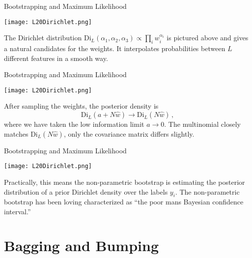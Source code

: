 \documentclass[10pt, table, dvipsnames,xcdraw, handout]{beamer}
\begin{document}
\begin{frame}[fragile]{Bootstrapping and Maximum Likelihood}
  \begin{minipage}[t][0.5\textheight][t]{\textwidth}
	\centering \texttt{[image: L20Dirichlet.png]} 
  \end{minipage}
  \vfill
\begin{minipage}[t][0.5\textheight][t]{\textwidth}
The Dirichlet distribution $\text{Di}_L(\alpha_1,\alpha_2, \alpha_3)\propto \prod_i w_i^{\alpha_i}$ is pictured above and gives a natural candidates for the weights. It interpolates probabilities between $L$ different features in a smooth way.
\end{minipage}
\end{frame}



\begin{frame}[fragile]{Bootstrapping and Maximum Likelihood}
  \begin{minipage}[t][0.5\textheight][t]{\textwidth}
	\centering \texttt{[image: L20Dirichlet.png]} 
  \end{minipage}
  \vfill
\begin{minipage}[t][0.5\textheight][t]{\textwidth}
After sampling the weights, the posterior density is 
$$
\text{Di}_L(a + N\hat{w})\to \text{Di}_L(N\hat{w})\,,
$$\pause 
where we have taken the low information limit $a\to 0$. The multinomial closely matches $\text{Di}_L(N\hat{w})$, only the covariance matrix differs slightly.
\end{minipage}
\end{frame}


\begin{frame}[fragile]{Bootstrapping and Maximum Likelihood}
  \begin{minipage}[t][0.5\textheight][t]{\textwidth}
	\centering \texttt{[image: L20Dirichlet.png]} 
  \end{minipage}
  \vfill
\begin{minipage}[t][0.5\textheight][t]{\textwidth}
Practically, this means the non-parametric bootstrap is estimating the posterior distribution of a prior Dirichlet density over the labels $y_i$. The non-parametric bootstrap has been loving characterized as ``the poor mans Bayesian confidence interval.''
\end{minipage}
\end{frame}



\section{Bagging and Bumping}
\end{document}
